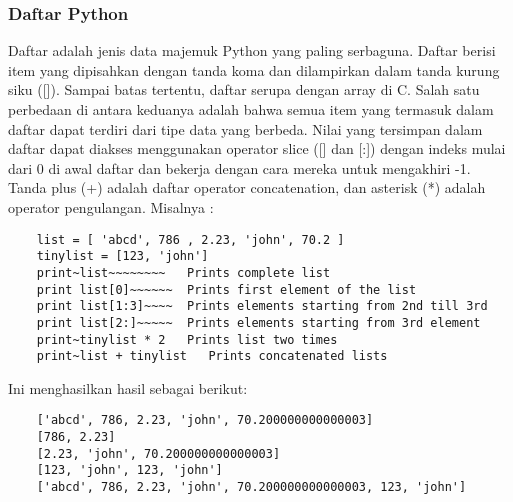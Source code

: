 \subsubsection{Daftar Python}
	Daftar adalah jenis data majemuk Python yang paling serbaguna. Daftar berisi item yang dipisahkan dengan tanda koma dan dilampirkan dalam tanda kurung siku ([]). Sampai batas tertentu, daftar serupa dengan array di C. Salah satu perbedaan di antara keduanya adalah bahwa semua item yang termasuk dalam daftar dapat terdiri dari tipe data yang berbeda.
Nilai yang tersimpan dalam daftar dapat diakses menggunakan operator slice ([] dan [:]) dengan indeks mulai dari 0 di awal daftar dan bekerja dengan cara mereka untuk mengakhiri -1. Tanda plus (+) adalah daftar operator concatenation, dan asterisk (*) adalah operator pengulangan.
Misalnya :
\begin{verbatim}
	list = [ 'abcd', 786 , 2.23, 'john', 70.2 ] 
	tinylist = [123, 'john'] 
	print~list~~~~~~~~   Prints complete list 
	print list[0]~~~~~~  Prints first element of the list 
	print list[1:3]~~~~  Prints elements starting from 2nd till 3rd  
	print list[2:]~~~~~  Prints elements starting from 3rd element 
	print~tinylist * 2   Prints list two times
	print~list + tinylist   Prints concatenated lists
\end{verbatim}
Ini menghasilkan hasil sebagai berikut:
\begin{verbatim}
	['abcd', 786, 2.23, 'john', 70.200000000000003] 
	[786, 2.23] 
	[2.23, 'john', 70.200000000000003] 
	[123, 'john', 123, 'john'] 
	['abcd', 786, 2.23, 'john', 70.200000000000003, 123, 'john'] 
\end{verbatim}
